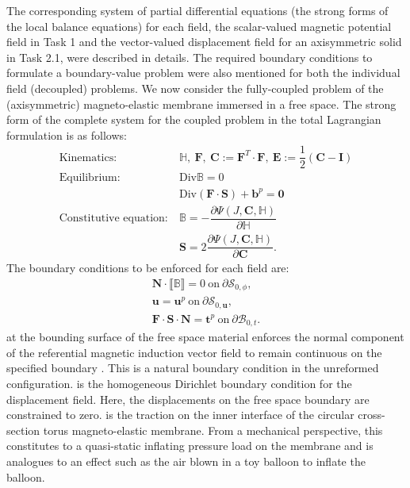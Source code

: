 The corresponding system of partial differential equations (the strong forms of the local balance equations) for each field, the scalar-valued magnetic potential field in Task 1 and the vector-valued displacement field for an axisymmetric solid in Task 2.1, were described in details. The required boundary conditions to formulate a boundary-value problem were also mentioned for both the individual field (decoupled) problems. We now consider the fully-coupled problem of the (axisymmetric) magneto-elastic membrane immersed in a free space. The strong form of the complete system for the coupled problem in the total Lagrangian formulation is as follows:
\begin{align}
\text{Kinematics}:& \ \mathbb{H}, \ \mathbf{F}, \ \mathbf{C} := \mathbf{F}^T \cdot \mathbf{F}, \ \mathbf{E} := \dfrac{1}{2} (\mathbf{C} - \mathbf{I}) \label{eq:3.22.1}\\
\text{Equilibrium}:& \ \text{Div} \mathbb{B} = 0 \label{eq:3.22.2}\\
& \ \text{Div}(\mathbf{F} \cdot \mathbf{S}) + \mathbf{b}^p = \mathbf{0} \label{eq:3.22.3}\\
\text{Constitutive equation}:& \ \mathbb{B} = -\dfrac{\partial \Psi (J, \mathbf{C}, \mathbb{H})}{\partial \mathbb{H}} \label{eq:3.22.4}\\
& \ \mathbf{S} = 2\dfrac{\partial \Psi (J, \mathbf{C}, \mathbb{H})}{\partial \mathbf{C}}.
\label{eq:3.22.5}
\end{align}
The boundary conditions to be enforced for each field are: 
\begin{align}
\mathbf{N} \cdot \llbracket \mathbb{B} \rrbracket = 0 \ \text{on} \ \partial \mathcal{S}_{0, \phi}, \label{eq:3.23.1}\\
\mathbf{u} = \mathbf{u}^p \ \text{on} \ \partial \mathcal{S}_{0, \mathbf{u}}, \label{eq:3.23.2}\\
\mathbf{F} \cdot \mathbf{S} \cdot \mathbf{N} = \mathbf{t}^p \ \text{on} \ \partial \mathcal{B}_{0, t}.
\label{eq:3.23.3}
\end{align}
 at the bounding surface of the free space material enforces the normal component of the referential magnetic induction vector field to remain continuous on the specified boundary \cite{pelteret2016}. This is a natural boundary condition in the unreformed configuration.  is the homogeneous Dirichlet boundary condition for the displacement field. Here, the displacements on the free space boundary are constrained to zero.  is the traction on the inner interface of the circular cross-section torus magneto-elastic membrane. From a mechanical perspective, this constitutes to a quasi-static inflating pressure load on the membrane and is analogues to an effect such as the air blown in a toy balloon to inflate the balloon. \newline \par 

